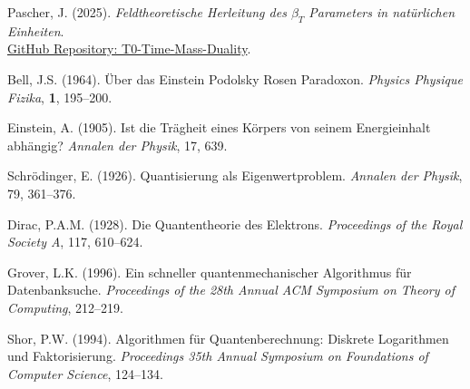 \documentclass[12pt,a4paper]{article}
\begin{document}
\begin{thebibliography}{99}
				Pascher, J. (2025). \textit{Feldtheoretische Herleitung des $\beta_T$ Parameters in natürlichen Einheiten}. \\
				\href{https://github.com/jpascher/T0-Time-Mass-Duality/blob/main/2/pdf/DerivationVonBetaEn.pdf}{GitHub Repository: T0-Time-Mass-Duality}.
				
				Bell, J.S. (1964). Über das Einstein Podolsky Rosen Paradoxon. \textit{Physics Physique Fizika}, \textbf{1}, 195--200.
				
				Einstein, A. (1905). Ist die Trägheit eines Körpers von seinem Energieinhalt abhängig? \textit{Annalen der Physik}, 17, 639.
				
				Schrödinger, E. (1926). Quantisierung als Eigenwertproblem. \textit{Annalen der Physik}, 79, 361--376.
				
				Dirac, P.A.M. (1928). Die Quantentheorie des Elektrons. \textit{Proceedings of the Royal Society A}, 117, 610--624.
				
				Grover, L.K. (1996). Ein schneller quantenmechanischer Algorithmus für Datenbanksuche. \textit{Proceedings of the 28th Annual ACM Symposium on Theory of Computing}, 212--219.
				
				Shor, P.W. (1994). Algorithmen für Quantenberechnung: Diskrete Logarithmen und Faktorisierung. \textit{Proceedings 35th Annual Symposium on Foundations of Computer Science}, 124--134.
				
			\end{thebibliography}
			
		
\end{document}
